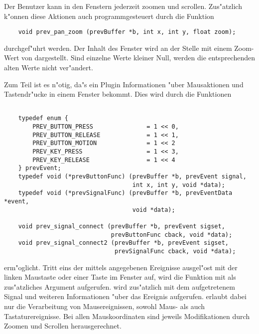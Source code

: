 Der Benutzer kann in den Fenstern jederzeit zoomen und
scrollen. Zus"atzlich k"onnen diese Aktionen auch programmgesteuert
durch die Funktion
\begin{small}
\linespread{0.9}
\begin{verbatim}
    void prev_pan_zoom (prevBuffer *b, int x, int y, float zoom);
\end{verbatim}
\end{small}
durchgef"uhrt werden. Der Inhalt des Fenster  wird an der
Stelle  mit einem Zoom-Wert von 
dargestellt. Sind einzelne Werte kleiner Null, werden die
entsprechenden alten Werte nicht ver"andert.

Zum Teil ist es n"otig, da"s ein Plugin Informationen "uber
Mausaktionen und Tastendr"ucke in einem Fenster bekommt. Dies wird
durch die Funktionen
\begin{small}
\linespread{0.9}
\begin{verbatim}

    typedef enum {
        PREV_BUTTON_PRESS               = 1 << 0,
        PREV_BUTTON_RELEASE             = 1 << 1,
        PREV_BUTTON_MOTION              = 1 << 2
        PREV_KEY_PRESS                  = 1 << 3,
        PREV_KEY_RELEASE                = 1 << 4
    } prevEvent;
    typedef void (*prevButtonFunc) (prevBuffer *b, prevEvent signal,
                                    int x, int y, void *data);
    typedef void (*prevSignalFunc) (prevBuffer *b, prevEventData *event,
                                    void *data);

    void prev_signal_connect (prevBuffer *b, prevEvent sigset,
                              prevButtonFunc cback, void *data);
    void prev_signal_connect2 (prevBuffer *b, prevEvent sigset,
                               prevSignalFunc cback, void *data);
\end{verbatim}
\end{small}
erm"oglicht. Tritt eins der mittels  angegebenen
Ereignisse ausgel"ost mit der linken Maustaste oder einer Taste im
Fenster  auf, wird die Funktion  mit 
als zus"atzliches Argument aufgerufen.  wird
zus"atzlich mit dem aufgetretenem Signal und weiteren Informationen
"uber das Ereignis aufgerufen.  erlaubt
dabei nur die Verarbeitung von Mausereignissen,
 sowohl Maus- als auch
Tastaturereignisse. Bei allen Mauskoordinaten sind jeweils
Modifikationen durch Zoomen und Scrollen herausgerechnet. 

